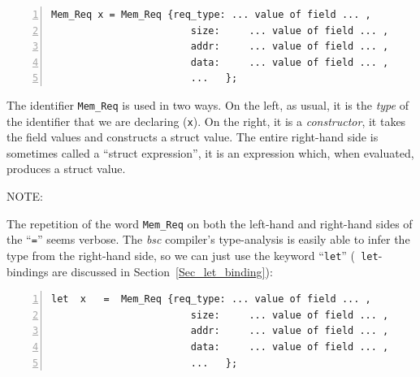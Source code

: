 {\footnotesize
\begin{Verbatim}[frame=single, numbers=left]
   Mem_Req x = Mem_Req {req_type: ... value of field ... ,
                        size:     ... value of field ... ,
                        addr:     ... value of field ... ,
                        data:     ... value of field ... ,
                        ...   };
\end{Verbatim}
}

The identifier {\tt Mem\_Req} is used in two ways.  On the left, as
usual, it is the \emph{type} of the identifier that we are declaring
({\tt x}).  On the right, it is a \emph{constructor}, {\ie} it takes
the field values and constructs a struct value.  The entire right-hand
side is sometimes called a ``struct expression'', {\ie} it is an
expression which, when evaluated, produces a struct value.

\vspace{2ex}

NOTE: 

\vspace{2ex}

The repetition of the word \verb|Mem_Req| on both the left-hand and
right-hand sides of the ``{\tt =}'' seems verbose.  The \emph{bsc}
compiler's type-analysis is easily able to infer the type from the
right-hand side, so we can just use the keyword ``\verb|let|'' ({\tt
let}-bindings are discussed in Section~\ref{Sec_let_binding}):


{\footnotesize
\begin{Verbatim}[frame=single, numbers=left]
   let  x   =  Mem_Req {req_type: ... value of field ... ,
                        size:     ... value of field ... ,
                        addr:     ... value of field ... ,
                        data:     ... value of field ... ,
                        ...   };
\end{Verbatim}
}

